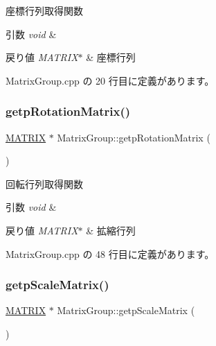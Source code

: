 座標行列取得関数 


\begin{DoxyParams}{引数}
{\em void} & \\
\hline
\end{DoxyParams}

\begin{DoxyRetVals}{戻り値}
{\em M\+A\+T\+R\+I\+X$\ast$} & 座標行列 \\
\hline
\end{DoxyRetVals}


 Matrix\+Group.\+cpp の 20 行目に定義があります。

\mbox{\label{class_matrix_group_a927f610535d5e9e308db0a42dc4fab65}} 
\subsubsection{\texorpdfstring{getp\+Rotation\+Matrix()}{getpRotationMatrix()}}
{\footnotesize\ttfamily \mbox{\hyperlink{_matrix_8h_a032295cd9fb1b711757c90667278e744}{M\+A\+T\+R\+IX}} $\ast$ Matrix\+Group\+::getp\+Rotation\+Matrix (\begin{DoxyParamCaption}{ }\end{DoxyParamCaption})}



回転行列取得関数 


\begin{DoxyParams}{引数}
{\em void} & \\
\hline
\end{DoxyParams}

\begin{DoxyRetVals}{戻り値}
{\em M\+A\+T\+R\+I\+X$\ast$} & 拡縮行列 \\
\hline
\end{DoxyRetVals}


 Matrix\+Group.\+cpp の 48 行目に定義があります。

\mbox{\label{class_matrix_group_ad7b235e886ef5fcd23ef4ee4377a57fd}} 
\subsubsection{\texorpdfstring{getp\+Scale\+Matrix()}{getpScaleMatrix()}}
{\footnotesize\ttfamily \mbox{\hyperlink{_matrix_8h_a032295cd9fb1b711757c90667278e744}{M\+A\+T\+R\+IX}} $\ast$ Matrix\+Group\+::getp\+Scale\+Matrix (\begin{DoxyParamCaption}{ }\end{DoxyParamCaption})}



